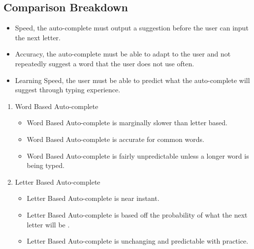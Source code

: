 \documentclass[onecolumn, draftclsnofoot,10pt, journal, letterpaper]{IEEEtran}
\begin{document}
    \subsection{Comparison Breakdown}
        \begin{itemize}
            \item Speed, the auto-complete must output a suggestion before the user can input the next letter.
            \item Accuracy, the auto-complete must be able to adapt to the user and not repeatedly suggest a word that the user does not use often.
            \item Learning Speed, the user must be able to predict what the auto-complete will suggest through typing experience.
        \end{itemize}
        
        \begin{enumerate}
            \item Word Based Auto-complete
            \begin{itemize}
                \item Word Based Auto-complete is marginally slower than letter based.
                \item Word Based Auto-complete is accurate for common words.
                \item Word Based Auto-complete is fairly unpredictable unless a longer word is being typed.
            \end{itemize}
            \item Letter Based Auto-complete
            \begin{itemize}
                \item Letter Based Auto-complete is near instant.
                \item Letter Based Auto-complete is based off the probability of what the next letter will be \cite{Construction}.
                \item Letter Based Auto-complete is unchanging and predictable with practice.
            \end{itemize}
        \end{enumerate}
        
\end{document}
